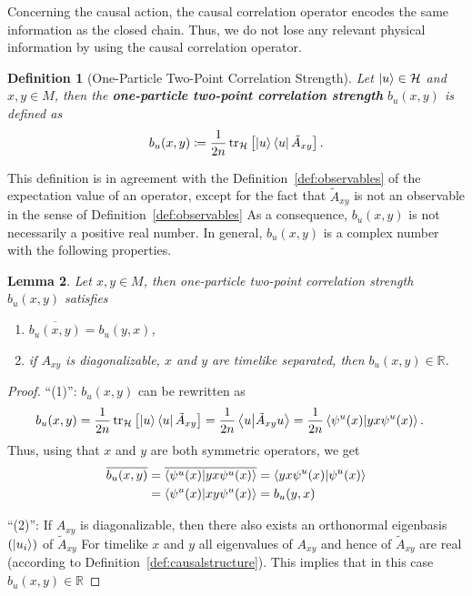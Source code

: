 \documentclass[reqno,11pt]{amsart}
\newcommand{\defeq}{\coloneqq}
\newcommand{\complexconj}[1]{\overline{#1}}
\newcommand{\R}{\mathbb{R}}
\renewcommand{\H}{\mathcal{H}}
\newtheorem{definition}{Definition}[section]
\newtheorem{lemma}[definition]{Lemma}
\numberwithin{equation}{section}
\begin{document}
Concerning the causal action, the causal correlation operator encodes the same information as the closed chain.
Thus, we do not lose any relevant physical information by using the causal correlation operator.

\begin{definition}[One-Particle Two-Point Correlation Strength]\label{def:1Pcorrelation}
    Let $\ket{u} \in \H$ and $x, y \in M$, then the \textbf{one-particle two-point correlation strength}
    $b_{u}(x, y)$ is defined as
    \begin{align}
        b_{u}(x, y) \defeq \frac{1}{2n} \tr_{\H} \left[ \ket{u} \bra{u} \tilde{A}_{xy} \right].
    \end{align}
\end{definition}

This definition is in agreement with the Definition~\ref{def:observables} of the expectation value of an operator, except for the fact
that $\tilde{A}_{xy}$ is not an observable in the sense of Definition~\ref{def:observables}
As a consequence, $b_u(x, y)$ is not necessarily a positive real number.
In general, $b_u(x, y)$ is a complex number with the following properties.
\begin{lemma}
    Let $x, y \in M$, then one-particle two-point correlation strength $b_{u}(x, y)$ satisfies
    \begin{enumerate}
        \item $\displaystyle \complexconj{b_u(x, y)} = b_u(y, x)$,
        \item if $A_{xy}$ is diagonalizable, $x$ and $y$ are timelike separated, then ${b_{u}(x, y) \in \R}$.
    \end{enumerate}
\end{lemma}
\begin{proof}
    ``(1)'':
    $b_u(x, y)$ can be rewritten as
    \begin{align*}
        b_u(x, y) &= \frac{1}{2n} \tr_{\H} \left[ \ket{u} \bra{u} \tilde{A}_{xy} \right] = \frac{1}{2n}  \braket{u}{\tilde{A}_{xy} u} = \frac{1}{2n} \braket{\psi^u(x)}{yx \psi^u(x)}.
    \end{align*}
    Thus, using that $x$ and $y$ are both symmetric operators, we get
    \begin{align*}
        \complexconj{b_u(x, y)} &= \complexconj{\braket{\psi^u(x)}{yx \psi^u(x)}} = \braket{yx \psi^u(x)}{\psi^u(x)} \\
        &= \braket{\psi^u(x)}{xy \psi^u(x)} = b_u(y, x)
    \end{align*}

    \noindent ``(2)'':
    If $A_{xy}$ is diagonalizable, then there also exists an orthonormal eigenbasis $\left( \ket{u_i} \right)$ of $\tilde{A}_{xy}$
    For timelike $x$ and $y$ all eigenvalues of $A_{xy}$ and hence of $\tilde{A}_{xy}$ are real (according to Definition~\ref{def:causalstructure}).
    This implies that in this case $b_u(x, y) \in \R$
\end{proof}
\end{document}
